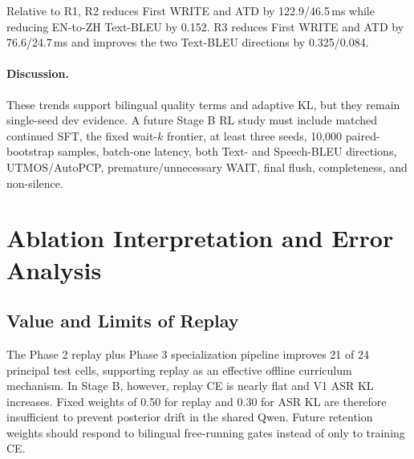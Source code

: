 \documentclass[11pt,a4paper]{article}
\begin{document}
\begin{table}[H]
\centering
\caption{Reward-v2 dev results. R1 is the matched rebalanced-plus-coverage control.}
\label{tab:rewardv2}
\end{table}

Relative to R1, R2 reduces First WRITE and ATD by 122.9/46.5\,ms while reducing EN-to-ZH Text-BLEU by 0.152. R3 reduces First WRITE and ATD by 76.6/24.7\,ms and improves the two Text-BLEU directions by 0.325/0.084.

\paragraph{Discussion.}
These trends support bilingual quality terms and adaptive KL, but they remain single-seed dev evidence. A future Stage B RL study must include matched continued SFT, the fixed wait-$k$ frontier, at least three seeds, 10,000 paired-bootstrap samples, batch-one latency, both Text- and Speech-BLEU directions, UTMOS/AutoPCP, premature/unnecessary WAIT, final flush, completeness, and non-silence.

\section{Ablation Interpretation and Error Analysis}

\subsection{Value and Limits of Replay}

The Phase 2 replay plus Phase 3 specialization pipeline improves 21 of 24 principal test cells, supporting replay as an effective offline curriculum mechanism. In Stage B, however, replay CE is nearly flat and V1 ASR KL increases. Fixed weights of 0.50 for replay and 0.30 for ASR KL are therefore insufficient to prevent posterior drift in the shared Qwen. Future retention weights should respond to bilingual free-running gates instead of only to training CE.
\end{document}
